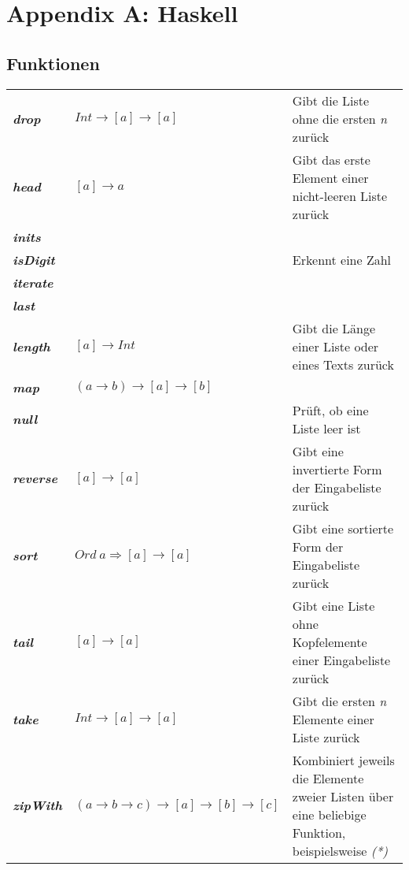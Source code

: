 \section{Appendix A: Haskell}

\subsection{Funktionen}
\begin{table}[H]
\begin{tabularx}{\textwidth}{l|X|X}
	\textbf{\textit{drop}} & \(Int \rightarrow [a] \rightarrow [a]\) & Gibt die Liste ohne die ersten \textit{n} zurück \\
	\textbf{\textit{head}} & \([a] \rightarrow a\) & Gibt das erste Element einer nicht-leeren Liste zurück \\
	\textbf{\textit{inits}} & & \\
	\textbf{\textit{isDigit}} & & Erkennt eine Zahl \\
	\textbf{\textit{iterate}} & & \\
	\textbf{\textit{last}} & & \\
	\textbf{\textit{length}} & \([a] \rightarrow Int\) & Gibt die Länge einer Liste oder eines Texts zurück \\
	\textbf{\textit{map}} & \((a \rightarrow b) \rightarrow [a] \rightarrow [b]\) & \\
	\textbf{\textit{null}} & & Prüft, ob eine Liste leer ist \\
	\textbf{\textit{reverse}} & \([a] \rightarrow [a]\) & Gibt eine invertierte Form der Eingabeliste zurück \\
	\textbf{\textit{sort}} & \(Ord~a \Rightarrow [a] \rightarrow [a]\) & Gibt eine sortierte Form der Eingabeliste zurück \\
	\textbf{\textit{tail}} & \([a] \rightarrow [a]\) & Gibt eine Liste ohne Kopfelemente einer Eingabeliste zurück \\
	\textbf{\textit{take}} & \(Int \rightarrow [a] \rightarrow [a]\) & Gibt die ersten \textit{n} Elemente einer Liste zurück \\
	\textbf{\textit{zipWith}} & \((a \rightarrow b \rightarrow c) \rightarrow [a] \rightarrow [b] \rightarrow [c]\) & Kombiniert jeweils die Elemente zweier Listen über eine beliebige Funktion, beispielsweise \textit{(*)} \\
\end{tabularx}
\end{table}



